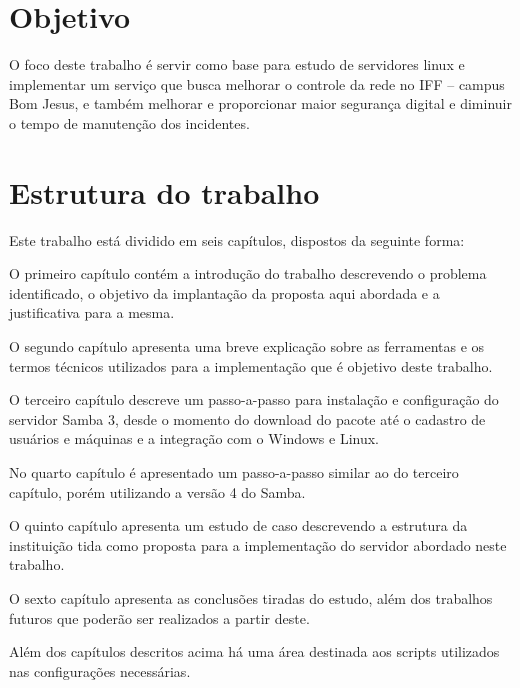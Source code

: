 \section{Objetivo}

O foco deste trabalho é servir como base para estudo de servidores linux e implementar um serviço que busca melhorar o controle da rede no IFF – campus Bom Jesus, e também melhorar e proporcionar maior segurança digital e diminuir o tempo de manutenção dos incidentes.

\section{Estrutura do trabalho}

Este trabalho está dividido em seis capítulos, dispostos da seguinte forma:

O primeiro capítulo contém a introdução do trabalho descrevendo o problema identificado, o objetivo da implantação da proposta aqui abordada e a justificativa para a mesma.

O segundo capítulo apresenta uma breve explicação sobre as ferramentas e os termos técnicos utilizados para a implementação que é objetivo deste trabalho. 

O terceiro capítulo descreve um passo-a-passo para instalação e configuração do servidor Samba 3, desde o momento do download do pacote até o cadastro de usuários e máquinas e a integração com o Windows e Linux.

No quarto capítulo é apresentado um passo-a-passo similar ao do terceiro capítulo, porém utilizando a versão 4 do Samba.

O quinto capítulo apresenta um estudo de caso descrevendo a estrutura da instituição tida como proposta para a implementação do servidor abordado neste trabalho.

O sexto capítulo apresenta as conclusões tiradas do estudo, além dos trabalhos futuros que poderão ser realizados a partir deste.

Além dos capítulos descritos acima há uma área destinada aos scripts utilizados nas configurações necessárias.